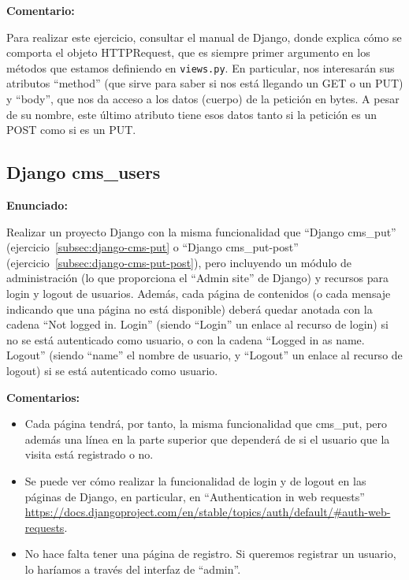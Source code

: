 \textbf{Comentario:}

Para realizar este ejercicio, consultar el manual de Django, donde explica cómo se comporta el objeto HTTPRequest, que es siempre primer argumento en los métodos que estamos definiendo en \texttt{views.py}. En particular, nos interesarán sus atributos ``method'' (que sirve para saber si nos está llegando un GET o un PUT) y ``body'', que nos da acceso a los datos (cuerpo) de la petición en bytes. A pesar de su nombre, este último atributo tiene esos datos tanto si la petición es un POST como si es un PUT. 



%

\subsection{Django cms\_users}
\label{subsec:django-users}

\textbf{Enunciado:}

Realizar un proyecto Django con la misma funcionalidad que ``Django cms\_put'' (ejercicio~\ref{subsec:django-cms-put} o ``Django cms\_put-post'' (ejercicio~\ref{subsec:django-cms-put-post}), pero incluyendo un módulo de administración (lo que proporciona el ``Admin site'' de Django) y recursos para login y logout de usuarios. Además, cada página de contenidos (o cada mensaje indicando que una página no está disponible) deberá quedar anotada con la cadena ``Not logged in. Login'' (siendo ``Login'' un enlace al recurso de login) si no se está autenticado como usuario, o con la cadena ``Logged in as name. Logout'' (siendo ``name'' el nombre de usuario, y ``Logout'' un enlace al recurso de logout) si se está autenticado como usuario.

\textbf{Comentarios:}

\begin{itemize}
  \item Cada página tendrá, por tanto, la misma funcionalidad que cms\_put, pero además una línea en la parte superior que dependerá de si el usuario que la visita está registrado o no.

  \item Se puede ver cómo realizar la funcionalidad de login y de logout en las páginas de Django, en particular, en ``Authentication in web requests'' \\
    \url{https://docs.djangoproject.com/en/stable/topics/auth/default/#auth-web-requests}.

  \item No hace falta tener una página de registro. Si queremos registrar un usuario, lo haríamos a través del interfaz de ``admin''.
\end{itemize}

